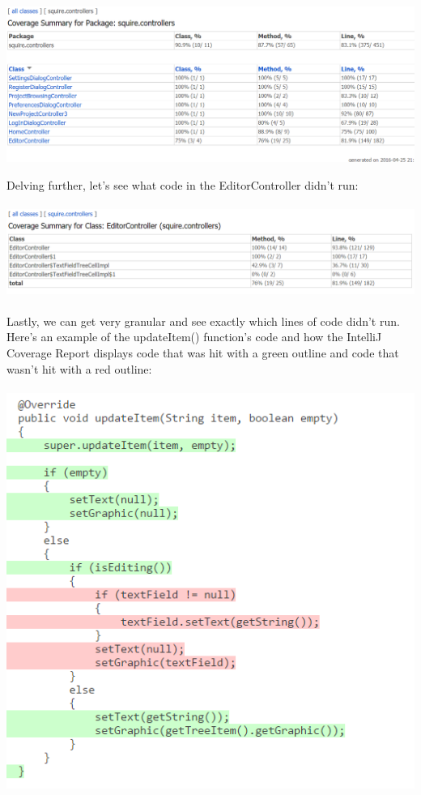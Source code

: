 \documentclass[14pt, a4paper]{article}
\begin{document}
\noindent\includegraphics[width=\textwidth]{ControllerCoverageTest}

\noindent Delving further, let's see what code in the EditorController didn't run: \\ \\

\noindent\includegraphics[width=\textwidth]{EditorControllerCoverage} \\ \\

\noindent Lastly, we can get very granular and see exactly which lines of code didn't run. Here's an example of the updateItem() function's code and how the IntelliJ Coverage Report displays code that was hit with a green outline and code that wasn't hit with a red outline: \\ \\

\noindent\includegraphics[scale=0.7]{EditorControllerCoverageFunction}
\end{document}
